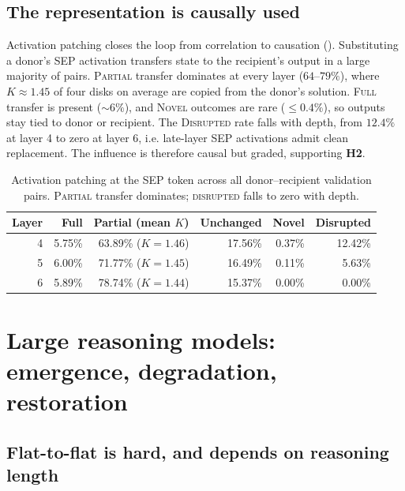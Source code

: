 \documentclass{article} %
\begin{document}
\subsection{The representation is causally used}

Activation patching closes the loop from correlation to causation (). Substituting a donor's SEP activation transfers state to the recipient's output in a large majority of pairs. \textsc{Partial} transfer dominates at every layer ($64$--$79\%$), where $K\approx1.45$ of four disks on average are copied from the donor's solution. \textsc{Full} transfer is present ($\sim6\%$), and \textsc{Novel} outcomes are rare ($\leq0.4\%$), so outputs stay tied to donor or recipient. The \textsc{Disrupted} rate falls with depth, from $12.4\%$ at layer 4 to zero at layer 6, i.e. late-layer SEP activations admit clean replacement. The influence is therefore causal but graded, supporting \textbf{H2}.

\begin{table}[t]
\centering
\caption{Activation patching at the SEP token across all donor--recipient validation pairs. \textsc{Partial} transfer dominates; \textsc{disrupted} falls to zero with depth.}
\label{tab:patching}
\begin{tabular}{rrrrrr}
\toprule
\textbf{Layer} & \textbf{Full} & \textbf{Partial (mean $K$)} & \textbf{Unchanged} & \textbf{Novel} & \textbf{Disrupted} \\
\midrule
4 & 5.75\% & 63.89\% ($K{=}1.46$) & 17.56\% & 0.37\% & 12.42\% \\
5 & 6.00\% & 71.77\% ($K{=}1.45$) & 16.49\% & 0.11\% &  5.63\% \\
6 & 5.89\% & 78.74\% ($K{=}1.44$) & 15.37\% & 0.00\% &  0.00\% \\
\bottomrule
\end{tabular}
\end{table}

\section{Large reasoning models: emergence, degradation, restoration}
\label{sec:lrm}

\subsection{Flat-to-flat is hard, and depends on reasoning length}
\label{sec:lrm-baselines}
\end{document}
